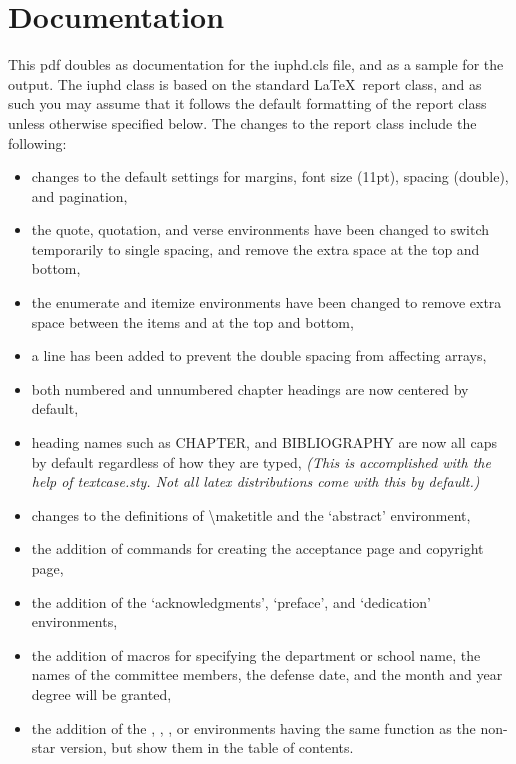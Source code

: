 \chapter{Documentation}

This pdf doubles as documentation for the iuphd.cls file, and as a sample for the output.
The iuphd class is based on the standard \LaTeX \ report class, and as such you may assume that it follows
the default formatting of the report class unless otherwise specified below.  The
changes to the report class include the following:

\begin{itemize}
 \item changes to the default settings for margins, font size (11pt), spacing (double), and pagination,
 \item the quote, quotation, and verse environments have been changed to switch temporarily to single spacing, and
       remove the extra space at the top and bottom,
 \item the enumerate and itemize environments have been changed to remove extra space between the items and at the
       top and bottom,
 \item a line has been added to prevent the double spacing from affecting arrays,
 \item both numbered and unnumbered chapter headings are now centered by default,
 \item heading names such as CHAPTER, and BIBLIOGRAPHY are now all caps by default regardless of how they are typed,
 \emph{(This is accomplished with the help of textcase.sty.  Not all latex distributions come with this by default.)}
 \item changes to the definitions of \textbackslash maketitle and the `abstract' environment,
 \item the addition of commands for creating the acceptance page and copyright page,
 \item the addition of the `acknowledgments', `preface', and `dedication' environments,
 \item the addition of macros for specifying the department or school name, the names of
 the committee members, the defense date, and the month and year degree will be granted,
 \item the addition of the , , , or  environments having the same function as the non-star version, but show them in the table of contents.
\end{itemize}

